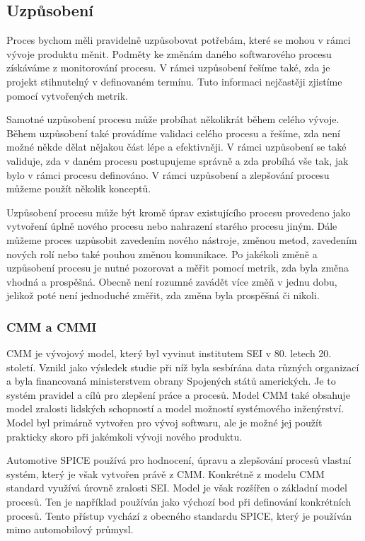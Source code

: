 \documentclass[czech,master,public,dept460,male,cpdeclaration,oneside]{diploma}
\begin{document}
\subsection{Uzpůsobení}
\label{sec:control}
Proces bychom měli pravidelně uzpůsobovat potřebám, které se mohou v rámci vývoje produktu měnit. Podměty ke změnám daného softwarového procesu získáváme z monitorování procesu. V rámci uzpůsobení řešíme také, zda je projekt stihnutelný v definovaném termínu. Tuto informaci nejčastěji zjistíme pomocí vytvořených metrik.

Samotné uzpůsobení procesu může probíhat několikrát během celého vývoje. Během uzpůsobení také provádíme validaci celého procesu a řešíme, zda není možné někde dělat nějakou část lépe a efektivněji. V rámci uzpůsobení se také validuje, zda v daném procesu postupujeme správně a zda probíhá vše tak, jak bylo v rámci procesu definováno. V rámci uzpůsobení a zlepšování procesu můžeme použít několik konceptů.

Uzpůsobení procesu může být kromě úprav existujícího procesu provedeno jako vytvoření úplně nového procesu nebo nahrazení starého procesu jiným. Dále můžeme proces uzpůsobit zavedením nového nástroje, změnou metod, zavedením nových rolí nebo také pouhou změnou komunikace. Po jakékoli změně a uzpůsobení procesu je nutné pozorovat a měřit pomocí metrik, zda byla změna vhodná a prospěšná. Obecně není rozumné zavádět více změň v jednu dobu, jelikož poté není jednoduché změřit, zda změna byla prospěšná či nikoli.

\subsubsection{CMM a CMMI}
CMM je vývojový model, který byl vyvinut institutem SEI v 80. letech 20. století. Vznikl jako výsledek studie při níž byla sesbírána data různých organizací a byla financovaná ministerstvem obrany Spojených států amerických. Je to systém pravidel a cílů pro zlepšení práce a procesů. Model CMM také obsahuje model zralosti lidských schopností a model možností systémového inženýrství. Model byl primárně vytvořen pro vývoj softwaru, ale je možné jej použít prakticky skoro při jakémkoli vývoji nového produktu. \cite{ref:cmm_cmmi}

Automotive SPICE používá pro hodnocení, úpravu a zlepšování procesů vlastní systém, který je však vytvořen právě z CMM. Konkrétně z modelu CMM standard využívá úrovně zralosti SEI. Model je však rozšířen o základní model procesů. Ten je například používán jako výchozí bod při definování konkrétních procesů. Tento přístup vychází z obecného standardu SPICE, který je používán mimo automobilový průmysl.
\end{document}
